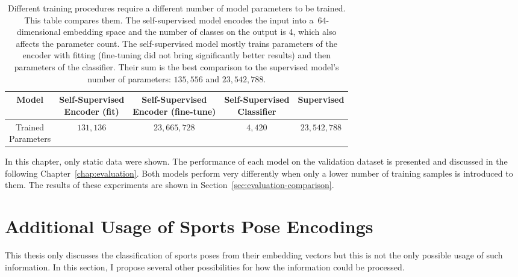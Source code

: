 \begin{table}[!ht]
    \begin{center}
        \begin{tabular}{ |c|||c|c|c||c| }
            \hline
                Model & \makecell{Self-Supervised \\ Encoder (fit)} & \makecell{Self-Supervised \\ Encoder (fine-tune)} & \makecell{Self-Supervised \\ Classifier} & Supervised \\
            \hline
            \hline
                \makecell{Trained \\ Parameters} & $131{,}136$ & $23{,}665{,}728$ & $4{,}420$ & $23{,}542{,}788$ \\
            \hline
        \end{tabular}
    \end{center}
    \caption{Different training procedures require a different number of model parameters to be trained. This table compares them. The self-supervised model encodes the input into a~64-dimensional embedding space and the number of classes on the output is 4, which also affects the parameter count. The self-supervised model mostly trains parameters of the encoder with fitting (fine-tuning did not bring significantly better results) and then parameters of the classifier. Their sum is the best comparison to the supervised model's number of parameters: $135{,}556$ and $23{,}542{,}788$.}
    \label{tab:selfsupervised-vs-supervised-params}
\end{table}

In this chapter, only static data were shown. The performance of each model on the validation dataset is presented and discussed in the following Chapter~\ref{chap:evaluation}. Both models perform very differently when only a lower number of training samples is introduced to them. The results of these experiments are shown in Section~\ref{sec:evaluation-comparison}.

\section{\label{sec:additional-usage}Additional Usage of Sports Pose Encodings}

This thesis only discusses the classification of sports poses from their embedding vectors but this is not the only possible usage of such information. In this section, I propose several other possibilities for how the information could be processed.

